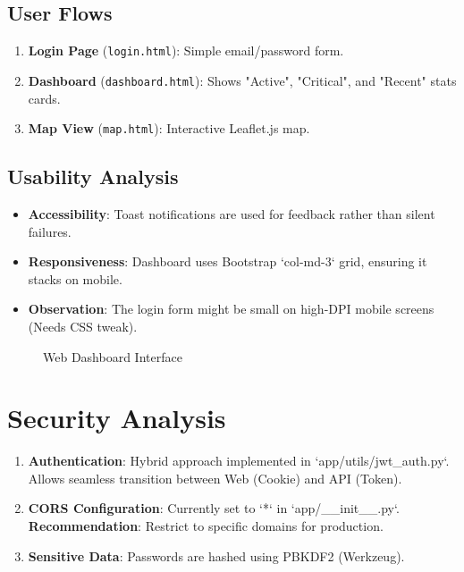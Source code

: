 \documentclass[12pt,a4paper]{article}
\begin{document}
\subsection{User Flows}
\begin{enumerate}
    \item \textbf{Login Page} (\texttt{login.html}): Simple email/password form.
    \item \textbf{Dashboard} (\texttt{dashboard.html}): Shows "Active", "Critical", and "Recent" stats cards.
    \item \textbf{Map View} (\texttt{map.html}): Interactive Leaflet.js map.
\end{enumerate}

\subsection{Usability Analysis}
\begin{itemize}
    \item \textbf{Accessibility}: Toast notifications are used for feedback rather than silent failures.
    \item \textbf{Responsiveness}: Dashboard uses Bootstrap `col-md-3` grid, ensuring it stacks on mobile.
    \item \textbf{Observation}: The login form might be small on high-DPI mobile screens (Needs CSS tweak).
\end{itemize}

\begin{figure}[h]
    \centering
    \caption{Web Dashboard Interface}
\end{figure}

\section{Security Analysis}
\begin{enumerate}
    \item \textbf{Authentication}: Hybrid approach implemented in `app/utils/jwt_auth.py`. Allows seamless transition between Web (Cookie) and API (Token).
    \item \textbf{CORS Configuration}: Currently set to `*` in `app/__init__.py`. \textbf{Recommendation}: Restrict to specific domains for production.
    \item \textbf{Sensitive Data}: Passwords are hashed using PBKDF2 (Werkzeug).
\end{enumerate}
\end{document}
